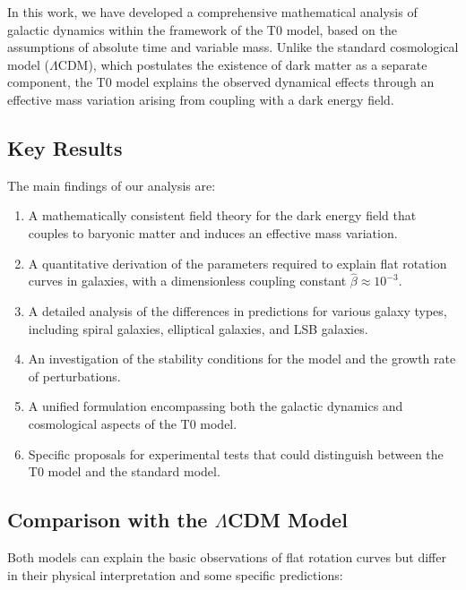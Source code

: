 \documentclass[a4paper,12pt]{article}
\begin{document}
	In this work, we have developed a comprehensive mathematical analysis of galactic dynamics within the framework of the T0 model, based on the assumptions of absolute time and variable mass. Unlike the standard cosmological model ($\Lambda$CDM), which postulates the existence of dark matter as a separate component, the T0 model explains the observed dynamical effects through an effective mass variation arising from coupling with a dark energy field.
	
	\subsection{Key Results}
	
	The main findings of our analysis are:
	
	\begin{enumerate}
		\item A mathematically consistent field theory for the dark energy field that couples to baryonic matter and induces an effective mass variation.
		
		\item A quantitative derivation of the parameters required to explain flat rotation curves in galaxies, with a dimensionless coupling constant $\hat{\beta} \approx 10^{-3}$.
		
		\item A detailed analysis of the differences in predictions for various galaxy types, including spiral galaxies, elliptical galaxies, and LSB galaxies.
		
		\item An investigation of the stability conditions for the model and the growth rate of perturbations.
		
		\item A unified formulation encompassing both the galactic dynamics and cosmological aspects of the T0 model.
		
		\item Specific proposals for experimental tests that could distinguish between the T0 model and the standard model.
	\end{enumerate}
	
	\subsection{Comparison with the $\Lambda$CDM Model}
	
	Both models can explain the basic observations of flat rotation curves but differ in their physical interpretation and some specific predictions:
	
\end{document}
